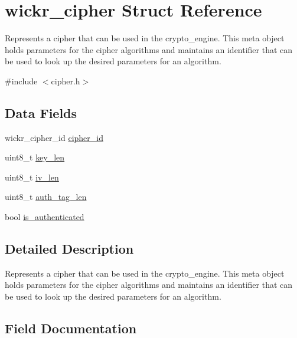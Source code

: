 \hypertarget{structwickr__cipher}{}\section{wickr\+\_\+cipher Struct Reference}
\label{structwickr__cipher}


Represents a cipher that can be used in the crypto\+\_\+engine. This meta object holds parameters for the cipher algorithms and maintains an identifier that can be used to look up the desired parameters for an algorithm.  




{\ttfamily \#include $<$cipher.\+h$>$}

\subsection*{Data Fields}
\begin{DoxyCompactItemize}
\item 
wickr\+\_\+cipher\+\_\+id \mbox{\hyperlink{structwickr__cipher_a2ce240f5bd396df05ddd4f30ba944b36}{cipher\+\_\+id}}
\item 
uint8\+\_\+t \mbox{\hyperlink{structwickr__cipher_aec5724cc59d20ae5d7cbb73684b53457}{key\+\_\+len}}
\item 
uint8\+\_\+t \mbox{\hyperlink{structwickr__cipher_a1cd39366934a31345d63ff42deeac1e3}{iv\+\_\+len}}
\item 
uint8\+\_\+t \mbox{\hyperlink{structwickr__cipher_a5ec0af7f260a3f14e31ce8db899aa06e}{auth\+\_\+tag\+\_\+len}}
\item 
bool \mbox{\hyperlink{structwickr__cipher_a21499cb78c9db301261c9d0d647b3e50}{is\+\_\+authenticated}}
\end{DoxyCompactItemize}


\subsection{Detailed Description}
Represents a cipher that can be used in the crypto\+\_\+engine. This meta object holds parameters for the cipher algorithms and maintains an identifier that can be used to look up the desired parameters for an algorithm. 

\subsection{Field Documentation}
\mbox{\label{structwickr__cipher_a5ec0af7f260a3f14e31ce8db899aa06e}} 
